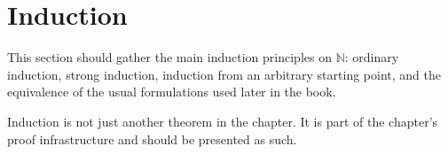 \section{Induction}

This section should gather the main induction principles on $\mathbb{N}$:
ordinary induction, strong induction, induction from an arbitrary starting
point, and the equivalence of the usual formulations used later in the book.

\begin{remark}
Induction is not just another theorem in the chapter. It is part of the
chapter's proof infrastructure and should be presented as such.
\end{remark}
